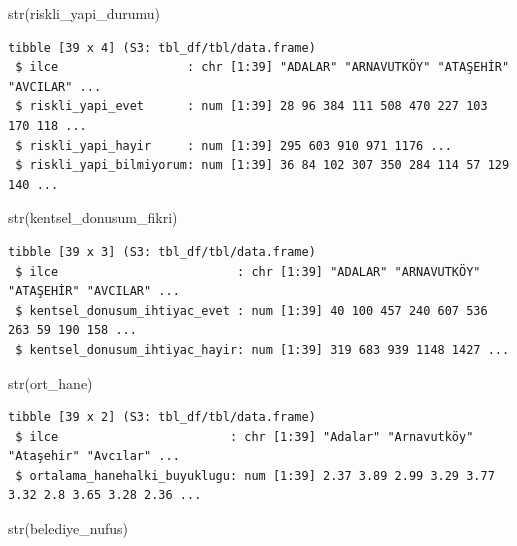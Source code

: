 \documentclass[
  11pt,
  a4paper,
  DIV=11,
  numbers=noendperiod]{scrartcl}
\newenvironment{Shaded}{\begin{snugshade}}{\end{snugshade}}
\newcommand{\FunctionTok}[1]{\textcolor[rgb]{0.28,0.35,0.67}{#1}}
\newcommand{\NormalTok}[1]{\textcolor[rgb]{0.00,0.23,0.31}{#1}}
\begin{document}
\begin{Shaded}
\begin{Highlighting}[]
\FunctionTok{str}\NormalTok{(riskli\_yapi\_durumu)}
\end{Highlighting}
\end{Shaded}

\begin{verbatim}
tibble [39 x 4] (S3: tbl_df/tbl/data.frame)
 $ ilce                  : chr [1:39] "ADALAR" "ARNAVUTKÖY" "ATAŞEHİR" "AVCILAR" ...
 $ riskli_yapi_evet      : num [1:39] 28 96 384 111 508 470 227 103 170 118 ...
 $ riskli_yapi_hayir     : num [1:39] 295 603 910 971 1176 ...
 $ riskli_yapi_bilmiyorum: num [1:39] 36 84 102 307 350 284 114 57 129 140 ...
\end{verbatim}

\begin{Shaded}
\begin{Highlighting}[]
\FunctionTok{str}\NormalTok{(kentsel\_donusum\_fikri)}
\end{Highlighting}
\end{Shaded}

\begin{verbatim}
tibble [39 x 3] (S3: tbl_df/tbl/data.frame)
 $ ilce                         : chr [1:39] "ADALAR" "ARNAVUTKÖY" "ATAŞEHİR" "AVCILAR" ...
 $ kentsel_donusum_ihtiyac_evet : num [1:39] 40 100 457 240 607 536 263 59 190 158 ...
 $ kentsel_donusum_ihtiyac_hayir: num [1:39] 319 683 939 1148 1427 ...
\end{verbatim}

\begin{Shaded}
\begin{Highlighting}[]
\FunctionTok{str}\NormalTok{(ort\_hane)}
\end{Highlighting}
\end{Shaded}

\begin{verbatim}
tibble [39 x 2] (S3: tbl_df/tbl/data.frame)
 $ ilce                        : chr [1:39] "Adalar" "Arnavutköy" "Ataşehir" "Avcılar" ...
 $ ortalama_hanehalki_buyuklugu: num [1:39] 2.37 3.89 2.99 3.29 3.77 3.32 2.8 3.65 3.28 2.36 ...
\end{verbatim}

\begin{Shaded}
\begin{Highlighting}[]
\FunctionTok{str}\NormalTok{(belediye\_nufus)}
\end{Highlighting}
\end{Shaded}
\end{document}
